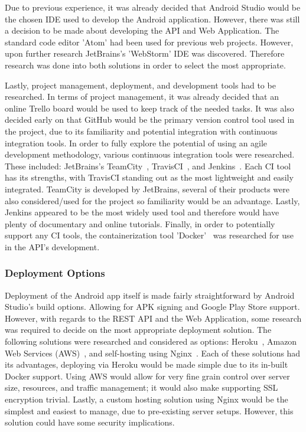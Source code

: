 Due to previous experience, it was already decided that Android Studio would be the chosen IDE used to develop the Android application. However, there was still a decision to be made about developing the API and Web Application. The standard code editor 'Atom' had been used for previous web projects. However, upon further research JetBrains's 'WebStorm' IDE was discovered. Therefore research was done into both solutions in order to select the most appropriate.

Lastly, project management, deployment, and development tools had to be researched. In terms of project management, it was already decided that an online Trello board would be used to keep track of the needed tasks. It was also decided early on that GitHub would be the primary version control tool used in the project, due to its familiarity and potential integration with continuous integration tools. In order to fully explore the potential of using an agile development methodology, various continuous integration tools were researched. These included: JetBrains's TeamCity~\cite{teamcity_documentation_ref}, TravisCI~\cite{travis_documentation_ref}, and Jenkins~\cite{jenkins_documentation_ref}. Each CI tool has its strengths, with TravisCI standing out as the most lightweight and easily integrated. TeamCity is developed by JetBrains, several of their products were also considered/used for the project so familiarity would be an advantage. Lastly, Jenkins appeared to be the most widely used tool and therefore would have plenty of documentary and online tutorials. Finally, in order to potentially support any CI tools, the containerization tool 'Docker'~\cite{docker_documentation_ref} was researched for use in the API's development.

\subsubsection{Deployment Options}
Deployment of the Android app itself is made fairly straightforward by Android Studio's build options. Allowing for APK signing and Google Play Store support. However, with regards to the REST API and the Web Application, some research was required to decide on the most appropriate deployment solution. The following solutions were researched and considered as options: Heroku~\cite{heroku_documentation_ref}, Amazon Web Services (AWS)~\cite{aws_documentation_ref}, and self-hosting using Nginx~\cite{nginx_documentation_ref}. Each of these solutions had its advantages, deploying via Heroku would be made simple due to its in-built Docker support. Using AWS would allow for very fine grain control over server size, resources, and traffic management; it would also make supporting SSL encryption trivial. Lastly, a custom hosting solution using Nginx would be the simplest and easiest to manage, due to pre-existing server setups. However, this solution could have some security implications.

